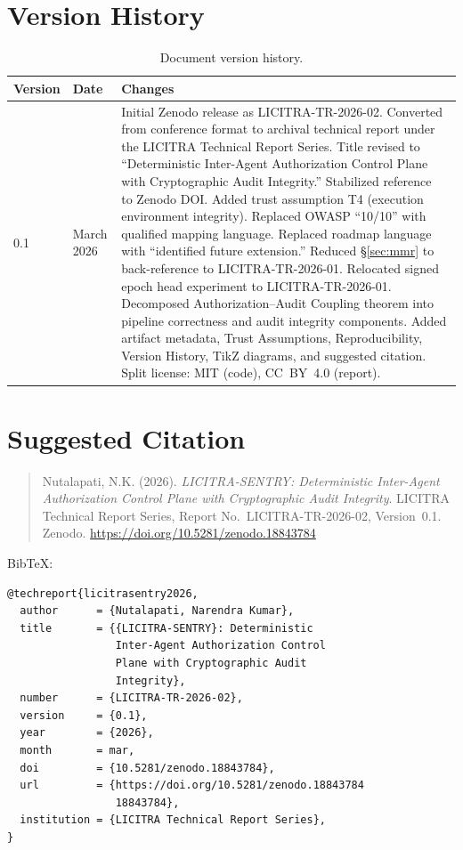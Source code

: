 \documentclass[11pt,a4paper]{article}
\begin{document}
\section{Version History}\label{sec:versions}

\begin{table}[ht]
\centering
\caption{Document version history.}
\label{tab:versions}
\begin{tabular}{@{}llp{8cm}@{}}
\toprule
\textbf{Version} & \textbf{Date} & \textbf{Changes} \\
\midrule
0.1 & March 2026 & Initial Zenodo release as LICITRA-TR-2026-02. Converted from conference
format to archival technical report under the LICITRA Technical Report Series. Title revised to
``Deterministic Inter-Agent Authorization Control Plane with Cryptographic Audit Integrity.''
Stabilized reference~\cite{licitrammr} to Zenodo DOI. Added trust assumption T4 (execution
environment integrity). Replaced OWASP ``10/10'' with qualified mapping language. Replaced
roadmap language with ``identified future extension.'' Reduced \S\ref{sec:mmr} to
back-reference to LICITRA-TR-2026-01. Relocated signed epoch head experiment to
LICITRA-TR-2026-01. Decomposed Authorization--Audit Coupling theorem into pipeline correctness
and audit integrity components. Added artifact metadata, Trust Assumptions, Reproducibility,
Version History, TikZ diagrams, and suggested citation. Split license: MIT (code), CC~BY~4.0
(report). \\
\bottomrule
\end{tabular}
\end{table}


\section*{Suggested Citation}

\begin{quote}
\small
Nutalapati, N.K. (2026). \emph{LICITRA-SENTRY: Deterministic Inter-Agent Authorization
Control Plane with Cryptographic Audit Integrity}. LICITRA Technical Report Series,
Report No.\ LICITRA-TR-2026-02, Version~0.1.
Zenodo. \url{https://doi.org/10.5281/zenodo.18843784}
\end{quote}

BibTeX:
\begin{verbatim}
@techreport{licitrasentry2026,
  author      = {Nutalapati, Narendra Kumar},
  title       = {{LICITRA-SENTRY}: Deterministic
                 Inter-Agent Authorization Control
                 Plane with Cryptographic Audit
                 Integrity},
  number      = {LICITRA-TR-2026-02},
  version     = {0.1},
  year        = {2026},
  month       = mar,
  doi         = {10.5281/zenodo.18843784},
  url         = {https://doi.org/10.5281/zenodo.18843784
                 18843784},
  institution = {LICITRA Technical Report Series},
}
\end{verbatim}
\end{document}
